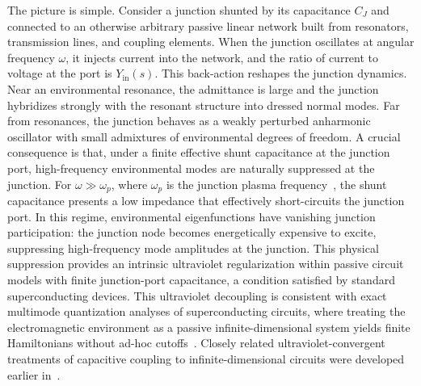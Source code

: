 \documentclass[reprint, floatfix, superscriptaddress, amsmath, amssymb, longbibliography]{revtex4-2}
\newcommand{\Yin}{Y_{\mathrm{in}}}
\begin{document}
The picture is simple. Consider a junction shunted by its capacitance $C_J$ and connected to an otherwise arbitrary passive linear network built from resonators, transmission lines, and coupling elements. When the junction oscillates at angular frequency $\omega$, it injects current into the network, and the ratio of current to voltage at the port is $\Yin(s)$. This back-action reshapes the junction dynamics. Near an environmental resonance, the admittance is large and the junction hybridizes strongly with the resonant structure into dressed normal modes. Far from resonances, the junction behaves as a weakly perturbed anharmonic oscillator with small admixtures of environmental degrees of freedom. A crucial consequence is that, under a finite effective shunt capacitance at the junction port, high-frequency environmental modes are naturally suppressed at the junction. For $\omega \gg \omega_p$, where $\omega_p$ is the junction plasma frequency~\cite{Koch2007}, the shunt capacitance presents a low impedance that effectively short-circuits the junction port. In this regime, environmental eigenfunctions have vanishing junction participation: the junction node becomes energetically expensive to excite, suppressing high-frequency mode amplitudes at the junction. This physical suppression provides an intrinsic ultraviolet regularization within passive circuit models with finite junction-port capacitance, a condition satisfied by standard superconducting devices. This ultraviolet decoupling is consistent with exact multimode quantization analyses of superconducting circuits, where treating the electromagnetic environment as a passive infinite-dimensional system yields finite Hamiltonians without ad-hoc cutoffs~\cite{ParraRodriguez2018, Malekakhlagh2016, Malekakhlagh2017}. Closely related ultraviolet-convergent treatments of capacitive coupling to infinite-dimensional circuits were developed earlier in~\cite{Paladino2003, Gely2017}.
\end{document}
